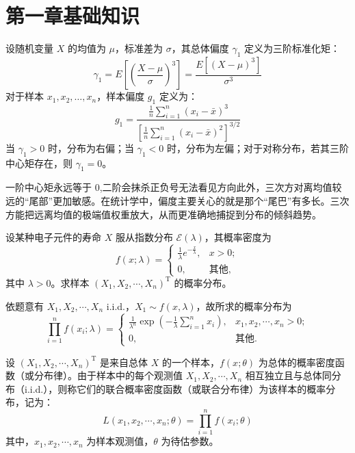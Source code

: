 \chapter{第一章基础知识}
\begin{definition}设随机变量 $X$ 的均值为 $\mu$，标准差为 $\sigma$，其总体偏度 $\gamma_1$ 定义为三阶标准化矩：$$ \gamma_1 = E\left[ \left( \frac{X - \mu}{\sigma} \right)^3 \right] = \frac{E[(X - \mu)^3]}{\sigma^3} $$对于样本 $x_1, x_2, \dots, x_n$，样本偏度 $g_1$ 定义为：$$ g_1 = \frac{\frac{1}{n} \sum_{i=1}^{n} (x_i - \bar{x})^3}{\left[ \frac{1}{n} \sum_{i=1}^{n} (x_i - \bar{x})^2 \right]^{3/2}} $$当 $\gamma_1 > 0$ 时，分布为右偏；当 $\gamma_1 < 0$ 时，分布为左偏；对于对称分布，若其三阶中心矩存在，则 $\gamma_1 = 0$。\end{definition}
\begin{dxtips}
    一阶中心矩永远等于 0,二阶会抹杀正负号无法看见方向此外，三次方对离均值较远的“尾部”更加敏感。在统计学中，偏度主要关心的就是那个“尾巴”有多长。三次方能把远离均值的极端值权重放大，从而更准确地捕捉到分布的倾斜趋势。
\end{dxtips}
\begin{example}
设某种电子元件的寿命 $X$ 服从指数分布 $\mathcal{E}(\lambda)$，其概率密度为
\[
f(x; \lambda) = 
\begin{cases} 
\frac{1}{\lambda} e^{-\frac{x}{\lambda}}, & x > 0; \\
0, & \text{其他},
\end{cases}
\]
其中 $\lambda > 0$。求样本 $(X_1, X_2, \cdots, X_n)^{\mathrm{T}}$ 的概率分布。
\end{example}

\begin{solution}
依题意有 $X_1, X_2, \cdots, X_n$ i.i.d.，$X_1 \sim f(x, \lambda)$，故所求的概率分布为
\[
\prod_{i=1}^{n} f(x_i; \lambda) = 
\begin{cases}
\frac{1}{\lambda^n} \exp \left( -\frac{1}{\lambda} \sum_{i=1}^{n} x_i \right), & x_1, x_2, \cdots, x_n > 0; \\
0, & \text{其他}.
\end{cases}
\]
\end{solution}

\begin{definition}
设 $(X_{1}, X_{2}, \cdots, X_{n})^{\mathrm{T}}$ 是来自总体 $X$ 的一个样本，$f(x; \theta)$ 为总体的概率密度函数（或分布律）。由于样本中的每个观测值 $X_{1}, X_{2}, \cdots, X_{n}$ 相互独立且与总体同分布（i.i.d.），则称它们的联合概率密度函数（或联合分布律）为该样本的概率分布，记为：
\[
L(x_{1}, x_{2}, \cdots, x_{n}; \theta) = \prod_{i=1}^{n} f(x_{i}; \theta)
\]
其中，$x_{1}, x_{2}, \cdots, x_{n}$ 为样本观测值，$\theta$ 为待估参数。
\end{definition}

